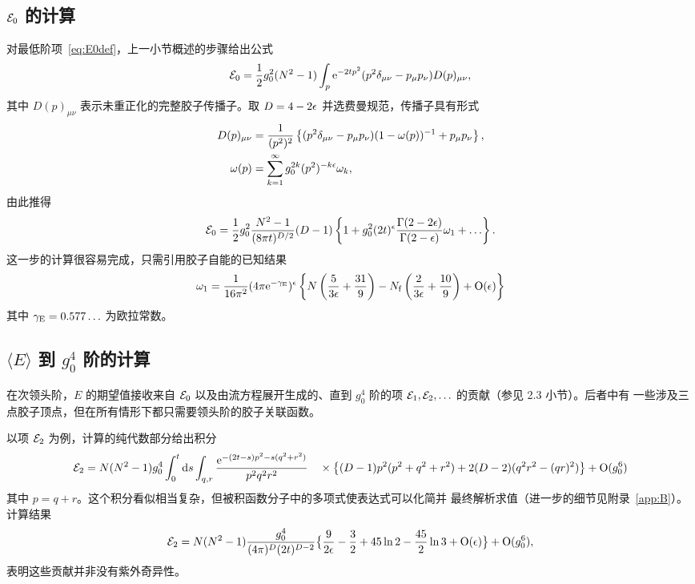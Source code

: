 \subsection{${\cal E}_0$ 的计算}

对最低阶项~\eqref{eq:E0def}，上一小节概述的步骤给出公式
\begin{equation}
  {\cal E}_0=\frac{1}{2}g_0^2(N^2-1)
  \int_p\mathrm{e}^{-2tp^2}
  (p^2\delta_{\mu\nu}-p_{\mu}p_{\nu})
  D(p)_{\mu\nu},
  \label{eq:E0int}
\end{equation}
其中 $D(p)_{\mu\nu}$ 表示未重正化的完整胶子传播子。取 $D=4-2\epsilon$
并选费曼规范，传播子具有形式
\begin{align}
  D(p)_{\mu\nu}&={1\over(p^2)^2}\left\{
  (p^2\delta_{\mu\nu}-p_{\mu}p_{\nu})(1-\omega(p))^{-1}+p_{\mu}p_{\nu}
  \right\},
  \\
  \omega(p)&=\sum_{k=1}^{\infty}g_0^{2k}(p^2)^{-k\epsilon}\omega_k,
\end{align}
由此推得
\begin{equation}
  {\cal E}_0=\frac{1}{2}g_0^2{N^2-1\over(8\pi t)^{D/2}}(D-1)
  \left\{1+g_0^2(2t)^{\epsilon}{\Gamma(2-2\epsilon)\over\Gamma(2-\epsilon)}\omega_1
  +\ldots\right\}.
  \label{eq:E0res}
\end{equation}
这一步的计算很容易完成，只需引用胶子自能的已知结果
\begin{equation}
  \omega_1={1\over 16\pi^2}(4\pi\mathrm{e}^{-\gamma_{\mathrm{E}}})^{\epsilon}
  \left\{N\left(\frac{5}{3\epsilon}+\frac{31}{9}\right)
  -N_{\mathrm{f}}\left(\frac{2}{3\epsilon}+\frac{10}{9}\right)
  +\mathrm{O}(\epsilon)\right\}
  \label{eq:omega1}
\end{equation}
其中 $\gamma_{\mathrm{E}}=0.577\ldots$ 为欧拉常数。


\subsection{$\langle E\rangle$ 到 $g_0^4$ 阶的计算}

在次领头阶，$E$ 的期望值接收来自 ${\cal E}_0$ 以及由流方程展开生成的、直到
$g_0^4$ 阶的项 ${\cal E}_1,{\cal E}_2,\ldots$ 的贡献（参见 2.3 小节）。后者中有
一些涉及三点胶子顶点，但在所有情形下都只需要领头阶的胶子关联函数。

以项 ${\cal E}_2$ 为例，计算的纯代数部分给出积分
\begin{equation}
   {\cal E}_2=N(N^2-1)g_0^4\int_0^t\mathrm{d} s\int_{q,r}
   {\mathrm{e}^{-(2t-s)p^2-s(q^2+r^2)}\over p^2q^2r^2}
   \nonumber\\
   \quad\times\bigl\{
   (D-1)p^2(p^2+q^2+r^2)+2(D-2)(q^2r^2-(qr)^2)\bigr\}
   +\mathrm{O}(g_0^6)
   \label{eq:E2int}
\end{equation}
其中 $p=q+r$。这个积分看似相当复杂，但被积函数分子中的多项式使表达式可以化简并
最终解析求值（进一步的细节见附录~\ref{app:B}）。计算结果
\begin{equation}
   {\cal E}_2=N(N^2-1){g_0^4\over(4\pi)^D(2t)^{D-2}}
   \bigl\{\frac{9}{2\epsilon}-\frac{3}{2}+45\ln2-\frac{45}{2}\ln3+
   \mathrm{O}(\epsilon)\bigr\}+\mathrm{O}(g_0^6),
   \label{eq:E2res}
\end{equation}
表明这些贡献并非没有紫外奇异性。

